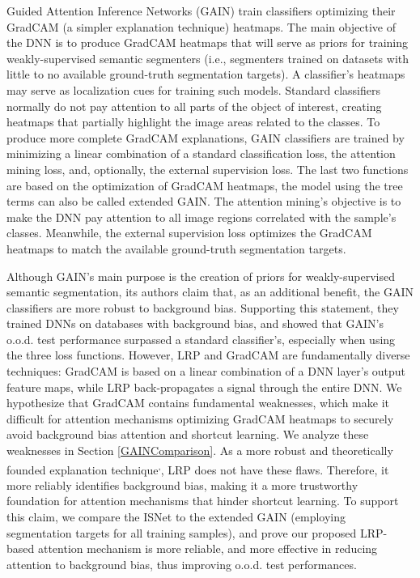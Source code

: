 \documentclass[fleqn,10pt]{wlscirep}
\begin{document}
Guided Attention Inference Networks\cite{GAIN} (GAIN) train classifiers optimizing their GradCAM\cite{GAIN} (a simpler explanation technique) heatmaps. The main objective of the DNN is to produce GradCAM heatmaps that will serve as priors for training weakly-supervised semantic segmenters (i.e., segmenters trained on datasets with little to no available ground-truth segmentation targets)\cite{SEC}. A classifier's heatmaps may serve as localization cues for training such models. Standard classifiers normally do not pay attention to all parts of the object of interest, creating heatmaps that partially highlight the image areas related to the classes. To produce more complete GradCAM explanations, GAIN classifiers are trained by minimizing a linear combination of a standard classification loss, the attention mining loss, and, optionally, the external supervision loss\cite{GAIN}. The last two functions are based on the optimization of GradCAM heatmaps, the model using the tree terms can also be called extended GAIN. The attention mining's objective is to make the DNN pay attention to all image regions correlated with the sample's classes. Meanwhile, the external supervision loss optimizes the GradCAM heatmaps to match the available ground-truth segmentation targets.

Although GAIN's main purpose is the creation of priors for weakly-supervised semantic segmentation, its authors claim that, as an additional benefit, the GAIN classifiers are more robust to background bias. Supporting this statement, they trained DNNs on databases with background bias, and showed that GAIN's o.o.d. test performance surpassed a standard classifier's, especially when using the three loss functions\cite{GAIN}. However, LRP and GradCAM are fundamentally diverse techniques: GradCAM is based on a linear combination of a DNN layer's output feature maps, while LRP back-propagates a signal through the entire DNN. We hypothesize that GradCAM contains fundamental weaknesses, which make it difficult for attention mechanisms optimizing GradCAM heatmaps to securely avoid background bias attention and shortcut learning. We analyze these weaknesses in Section \ref{GAINComparison}. As a more robust and theoretically founded explanation technique\cite{LRP}\textsuperscript{,}\cite{LRPRobustness}, LRP does not have these flaws. Therefore, it more reliably identifies background bias, making it a more trustworthy foundation for attention mechanisms that hinder shortcut learning. To support this claim, we compare the ISNet to the extended GAIN (employing segmentation targets for all training samples), and prove our proposed LRP-based attention mechanism is more reliable, and more effective in reducing attention to background bias, thus improving o.o.d. test performances. 
\end{document}
